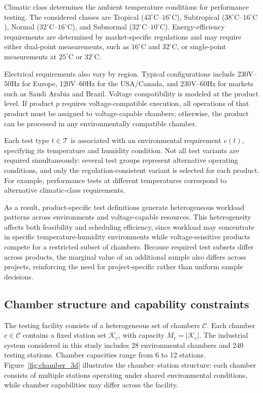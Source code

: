\documentclass[11pt]{article}
\begin{document}
Climatic class determines the ambient temperature conditions for performance testing. The considered classes are Tropical (\(43^\circ\mathrm{C}\)--\(16^\circ\mathrm{C}\)), Subtropical (\(38^\circ\mathrm{C}\)--\(16^\circ\mathrm{C}\)), Normal (\(32^\circ\mathrm{C}\)--\(16^\circ\mathrm{C}\)), and Subnormal (\(32^\circ\mathrm{C}\)--\(10^\circ\mathrm{C}\)). Energy-efficiency requirements are determined by market-specific regulations and may require either dual-point measurements, such as \(16^\circ\mathrm{C}\) and \(32^\circ\mathrm{C}\), or single-point measurements at \(25^\circ\mathrm{C}\) or \(32^\circ\mathrm{C}\).

Electrical requirements also vary by region. Typical configurations include 230V--50Hz for Europe, 120V--60Hz for the USA/Canada, and 230V--60Hz for markets such as Saudi Arabia and Brazil. Voltage compatibility is modeled at the product level. If product \(p\) requires voltage-compatible execution, all operations of that product must be assigned to voltage-capable chambers; otherwise, the product can be processed in any environmentally compatible chamber.

Each test type \(t\in\mathcal{T}\) is associated with an environmental requirement \(e(t)\), specifying its temperature and humidity condition. Not all test variants are required simultaneously: several test groups represent alternative operating conditions, and only the regulation-consistent variant is selected for each product. For example, performance tests at different temperatures correspond to alternative climatic-class requirements.

As a result, product-specific test definitions generate heterogeneous workload patterns across environments and voltage-capable resources. This heterogeneity affects both feasibility and scheduling efficiency, since workload may concentrate in specific temperature-humidity environments while voltage-sensitive products compete for a restricted subset of chambers. Because required test subsets differ across products, the marginal value of an additional sample also differs across projects, reinforcing the need for project-specific rather than uniform sample decisions.

\subsection{Chamber structure and capability constraints}
\label{subsec:chamber_capabilities}

The testing facility consists of a heterogeneous set of chambers \(\mathcal{C}\). Each chamber \(c\in\mathcal{C}\) contains a fixed station set \(\mathcal{K}_c\), with capacity \(M_c=|\mathcal{K}_c|\). The industrial system considered in this study includes 28 environmental chambers and 240 testing stations. Chamber capacities range from 6 to 12 stations. Figure~\ref{fig:chamber_3d} illustrates the chamber--station structure: each chamber consists of multiple stations operating under shared environmental conditions, while chamber capabilities may differ across the facility.
\end{document}
